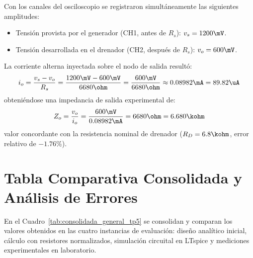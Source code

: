 Con los canales del osciloscopio se registraron simultáneamente las siguientes amplitudes:
\begin{itemize}
  \item Tensión provista por el generador (CH1, antes de $R_s$): $v_s = 1200\mV$.
  \item Tensión desarrollada en el drenador (CH2, después de $R_s$): $v_o = 600\mV$.
\end{itemize}

La corriente alterna inyectada sobre el nodo de salida resultó:
\begin{equation}
  i_o = \frac{v_s - v_o}{R_s} = \frac{1200\mV - 600\mV}{6680\ohm} = \frac{600\mV}{6680\ohm} \approx 0.08982\mA = 89.82\uA
  \label{eq:io_exp_tp5}
\end{equation}
obteniéndose una impedancia de salida experimental de:
\begin{equation}
  Z_o = \frac{v_o}{i_o} = \frac{600\mV}{0.08982\mA} = 6680\ohm = 6.680\kohm
  \label{eq:Zo_exp_tp5}
\end{equation}
valor concordante con la resistencia nominal de drenador ($R_D = 6.8\kohm$, error relativo de $-1.76\%$).

\section{Tabla Comparativa Consolidada y Análisis de Errores}

En el Cuadro~\ref{tab:consolidada_general_tp5} se consolidan y comparan los valores obtenidos en las cuatro instancias
de evaluación: diseño analítico inicial, cálculo con resistores normalizados, simulación circuital en LTspice y
mediciones experimentales en laboratorio.

